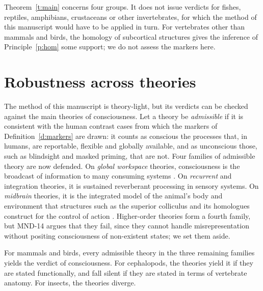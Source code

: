 \documentclass{situationist-preprint}
\begin{document}
\begin{remark}\label{r:scope}
Theorem~\ref{t:main} concerns four groups. It does not issue verdicts for fishes, reptiles, amphibians, crustaceans or other invertebrates, for which the method of this manuscript would have to be applied in turn. For vertebrates other than mammals and birds, the homology of subcortical structures gives the inference of Principle~\ref{p:hom} some support; we do not assess the markers here.
\end{remark}

\section{Robustness across theories}\label{s:robust}

The method of this manuscript is theory-light, but its verdicts can be checked against the main theories of consciousness. Let a theory be \emph{admissible} if it is consistent with the human contrast cases from which the markers of Definition~\ref{d:markers} are drawn: it counts as conscious the processes that, in humans, are reportable, flexible and globally available, and as unconscious those, such as blindsight and masked priming, that are not. Four families of admissible theory are now defended. On \emph{global workspace} theories, consciousness is the broadcast of information to many consuming systems \citep{Dehaene2014}. On \emph{recurrent} and integration theories, it is sustained reverberant processing in sensory systems. On \emph{midbrain} theories, it is the integrated model of the animal's body and environment that structures such as the superior colliculus and its homologues construct for the control of action \citep{Merker2007,Barron2016}. Higher-order theories form a fourth family, but MND-14 argues that they fail, since they cannot handle misrepresentation without positing consciousness of non-existent states; we set them aside.

\begin{proposition}[Robustness]\label{p:robust}
For mammals and birds, every admissible theory in the three remaining families yields the verdict of consciousness. For cephalopods, the theories yield it if they are stated functionally, and fall silent if they are stated in terms of vertebrate anatomy. For insects, the theories diverge.
\end{proposition}
\end{document}
